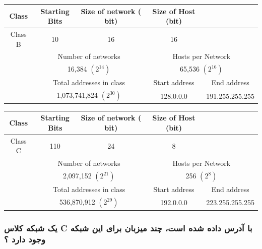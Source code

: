 \documentclass[12pt]{book}
\begin{document}
\begin{latin}
\begin{center}
  \bgroup
  \def\arraystretch{1.5}%
  \begin{tabular}{ c  c  c  c  c    }
    Class & Starting Bits & Size of network ( bit) & Size of Host (bit) & \\
    \hline
    Class B & 10 & 16 & 16 & \\ \hline
           & \multicolumn{2}{c}{Number of networks} & \multicolumn{2}{c}{Hosts per Network}   \\ \hline
          & \multicolumn{2}{c}{16,384 $(2^{14})$} & \multicolumn{2}{c}{65,536 $(2^{16})$}   \\ \hline
   & \multicolumn{2}{c}{Total addresses in class}  & Start address & End address  \\ \hline
   & \multicolumn{2}{c}{1,073,741,824 $(2^{30})$} & 128.0.0.0 & 	191.255.255.255  \\ \hline
  \end{tabular}
  \egroup
\end{center}
\end{latin}



\begin{latin}
\begin{center}
  \bgroup
  \def\arraystretch{1.5}%
  \begin{tabular}{ c  c  c  c  c   }
    Class & Starting Bits & Size of network ( bit) & Size of Host (bit) & \\
    \hline
    Class C & 110 & 24 & 8 & \\ \hline
    & \multicolumn{2}{c}{Number of networks} & \multicolumn{2}{c}{Hosts per Network}   \\ \hline
    & \multicolumn{2}{c}{2,097,152 $(2^{21})$} & \multicolumn{2}{c}{256 $(2^{8})$}   \\ \hline
   & \multicolumn{2}{c}{Total addresses in class}  & Start address & End address  \\ \hline
   & \multicolumn{2}{c}{536,870,912 $(2^{29})$} & 192.0.0.0 & 	223.255.255.255   \\ \hline
  \end{tabular}
  \egroup
\end{center}
\end{latin}



\subsubsection{
 یک شبکه کلاس C با آدرس 
داده شده است، چند میزبان برای  این شبکه وجود دارد ؟ 
}
\end{document}
